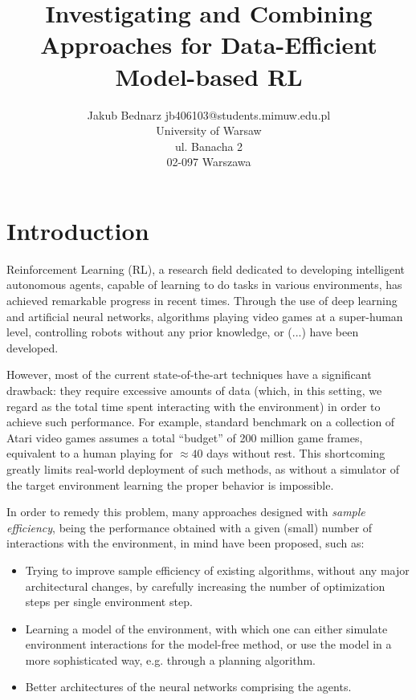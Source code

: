 \documentclass[twoside,11pt]{article}
\begin{document}
\title{Investigating and Combining Approaches for Data-Efficient Model-based RL}

\author{
  \name Jakub Bednarz
  \email jb406103@students.mimuw.edu.pl \\
  \addr University of Warsaw \\
  ul. Banacha 2 \\
  02-097 Warszawa
}

\maketitle

\section{Introduction}

Reinforcement Learning (RL), a research field dedicated to developing intelligent autonomous agents, capable of learning to do tasks in various environments, has achieved remarkable progress in recent times. Through the use of deep learning and artificial neural networks, algorithms playing video games at a super-human level, controlling robots without any prior knowledge, or (...) have been developed.

However, most of the current state-of-the-art techniques have a significant drawback: they require excessive amounts of data (which, in this setting, we regard as the total time spent interacting with the environment) in order to achieve such performance. For example, standard benchmark on a collection of Atari video games assumes a total ``budget'' of 200 million game frames, equivalent to a human playing for $\approx 40$ days without rest. This shortcoming greatly limits real-world deployment of such methods, as without a simulator of the target environment learning the proper behavior is impossible.

In order to remedy this problem, many approaches designed with \emph{sample efficiency}, being the performance obtained with a given (small) number of interactions with the environment, in mind have been proposed, such as:

\begin{itemize}
  \item Trying to improve sample efficiency of existing algorithms, without any major architectural changes, by carefully increasing the number of optimization steps per single environment step.
  \item Learning a model of the environment, with which one can either simulate environment interactions for the model-free method, or use the model in a more sophisticated way, e.g. through a planning algorithm.
  \item Better architectures of the neural networks comprising the agents.
\end{itemize}
\end{document}
